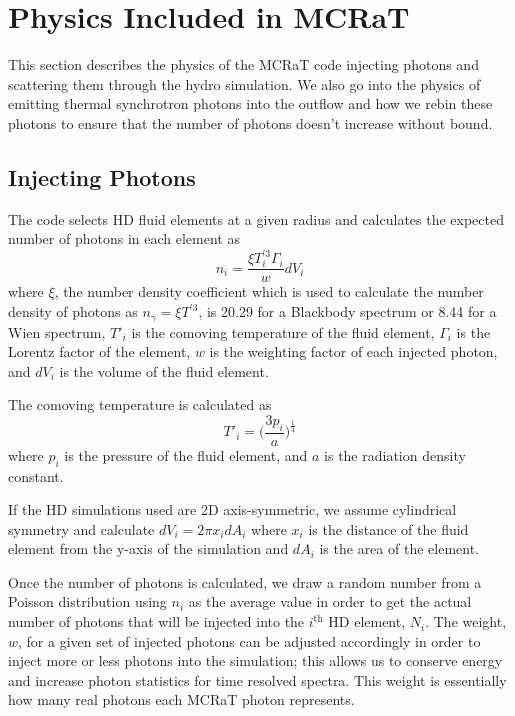 \documentclass[12pt,a4paper]{article}
\begin{document}
\section{Physics Included in MCRaT}
This section describes the physics of the MCRaT code injecting photons and scattering them through the hydro simulation. We also go into the physics of emitting thermal synchrotron photons into the outflow and how we rebin these photons to ensure that the number of photons doesn't increase without bound.

\subsection{Injecting Photons} \label{inj}
The code selects HD fluid elements at a given radius and calculates the expected number of photons in each element as
\begin{equation} \label{n_density}
n_i=\frac{\xi T_i^{'3}\Gamma_i}{w}dV_i 
\end{equation} 
where $\xi$, the number density coefficient which is used to calculate the number density of photons as $n_\gamma=\xi T^{'3}$, is 20.29 for a Blackbody spectrum or 8.44 for a Wien spectrum, $T'_i$ is the comoving temperature of the fluid element, $\Gamma_i$ is the Lorentz factor of the element, $w$ is the weighting factor of each injected photon, and $dV_i$ is the volume of the fluid element. 
 
The comoving temperature is calculated as
\begin{equation}
T'_i=\big( \frac{3p_i}{a} \big)^\frac{1}{4}
\end{equation}
where $p_i$ is the pressure of the fluid element, and $a$ is the radiation density constant.
 
If the HD simulations used are 2D axis-symmetric, we assume cylindrical symmetry and calculate $dV_i=2\pi x_idA_i$ where $x_i$ is the distance of the fluid element from the y-axis of the simulation and $dA_i$ is the area of the element. 
 
Once the number of photons is calculated, we draw a random number from a Poisson distribution using $n_i$ as the average value in order to get the actual number of photons that will be injected into the $i^\text{th}$ HD element, $N_i$. The weight, $w$, for a given set of injected photons can be adjusted accordingly in order to inject more or less photons into the simulation; this allows us to conserve energy and increase photon statistics for time resolved spectra. This weight is essentially how many real photons each MCRaT photon represents.
\end{document}
